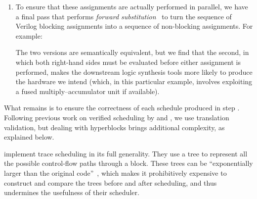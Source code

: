 \begin{enumerate}[label=\protect\blacknum{\arabic*}]
 \item To ensure that these assignments are actually performed in parallel, we have a final pass that performs \emph{forward substitution}~\cite[p.~109]{hopwoodthesis} to turn the sequence of Verilog blocking assignments into a sequence of non-blocking assignments. For example:
\begin{center}
\end{center}
The two versions are semantically equivalent, but we find that the second, in which both right-hand sides must be evaluated before either assignment is performed, makes the downstream logic synthesis tools more likely to produce the hardware we intend (which, in this particular example, involves exploiting a fused multiply--accumulator unit if available).

\end{enumerate}

\noindent
What remains is to ensure the correctness of each schedule produced in step . Following previous work on verified scheduling by \textcite{tristan08_formal_verif_trans_valid} and \textcite{six22_formal_verif_super_sched}, we use translation validation, but dealing with hyperblocks brings additional complexity, as explained below.

\citeauthor{tristan08_formal_verif_trans_valid} implement trace scheduling in its full generality. They use a tree to represent all the possible control-flow paths through a block. These trees can be ``exponentially larger than the original code''~\cite[p.~25]{tristan08_formal_verif_trans_valid}, which makes it prohibitively expensive to construct and compare the trees before and after scheduling, and thus undermines the usefulness of their scheduler.

